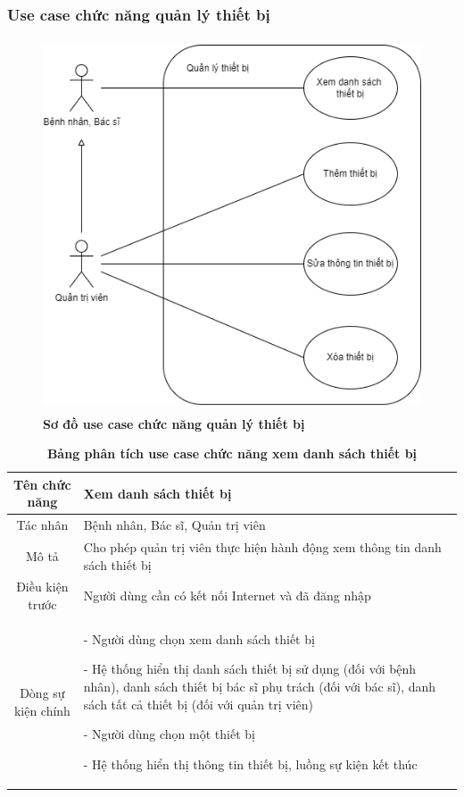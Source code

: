 \subsubsection{Use case chức năng quản lý thiết bị}
  \begin{figure}[H]
    \centering
    \includegraphics[width=12cm,height=11cm]{Images/use_case/use_case_manage_device.png}
    \caption[Sơ đồ use case chức năng quản lý thiết bị]{\bfseries \fontsize{12pt}{0pt}
    \selectfont Sơ đồ use case chức năng quản lý thiết bị}
    \label{use_case_device_management} %
  \end{figure}

  \begin{table}[H]
    \caption{\bfseries \fontsize{12pt}{0pt}\selectfont Bảng phân tích use case chức năng xem danh sách thiết bị}
    \centering
    \begin{tabularx}{0.9\textwidth}{|c|X|}
      \hline
      \textbf{Tên chức năng} & \textbf{Xem danh sách thiết bị} \\
      \hline
      Tác nhân & Bệnh nhân, Bác sĩ, Quản trị viên \\
      \hline
      Mô tả & Cho phép quản trị viên thực hiện hành động xem thông tin danh sách thiết bị \\
      \hline
      Điều kiện trước & Người dùng cần có kết nối Internet và đã đăng nhập \\
      \hline
      Dòng sự kiện chính & 
        - Người dùng chọn xem danh sách thiết bị
        
        - Hệ thống hiển thị danh sách thiết bị sử dụng (đối với bệnh nhân), danh sách thiết bị bác sĩ phụ trách (đối với bác sĩ), 
        danh sách tất cả thiết bị (đối với quản trị viên)

        - Người dùng chọn một thiết bị

        - Hệ thống hiển thị thông tin thiết bị, luồng sự kiện kết thúc 
        \\
      \hline
    \end{tabularx}
  \end{table}

